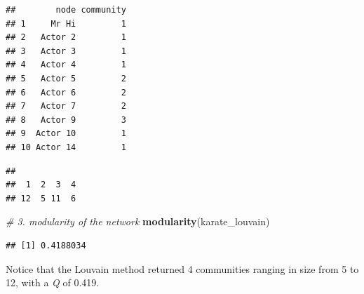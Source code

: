 \documentclass[
]{book}
\newenvironment{Shaded}{\begin{snugshade}}{\end{snugshade}}
\newcommand{\AttributeTok}[1]{\textcolor[rgb]{0.13,0.29,0.53}{#1}}
\newcommand{\CommentTok}[1]{\textcolor[rgb]{0.56,0.35,0.01}{\textit{#1}}}
\newcommand{\DecValTok}[1]{\textcolor[rgb]{0.00,0.00,0.81}{#1}}
\newcommand{\FunctionTok}[1]{\textcolor[rgb]{0.13,0.29,0.53}{\textbf{#1}}}
\newcommand{\NormalTok}[1]{#1}
\newcommand{\OtherTok}[1]{\textcolor[rgb]{0.56,0.35,0.01}{#1}}
\newcommand{\SpecialCharTok}[1]{\textcolor[rgb]{0.81,0.36,0.00}{\textbf{#1}}}
\begin{document}
\begin{Shaded}
\end{Shaded}

\begin{verbatim}
##        node community
## 1     Mr Hi         1
## 2   Actor 2         1
## 3   Actor 3         1
## 4   Actor 4         1
## 5   Actor 5         2
## 6   Actor 6         2
## 7   Actor 7         2
## 8   Actor 9         3
## 9  Actor 10         1
## 10 Actor 14         1
\end{verbatim}

\begin{Shaded}
\end{Shaded}

\begin{verbatim}
## 
##  1  2  3  4 
## 12  5 11  6
\end{verbatim}

\begin{Shaded}
\begin{Highlighting}[]
\CommentTok{\# 3. modularity of the network }
\FunctionTok{modularity}\NormalTok{(karate\_louvain)  }
\end{Highlighting}
\end{Shaded}

\begin{verbatim}
## [1] 0.4188034
\end{verbatim}

Notice that the Louvain method returned 4 communities ranging in size from 5 to 12, with a \emph{Q} of 0.419.
\end{document}
